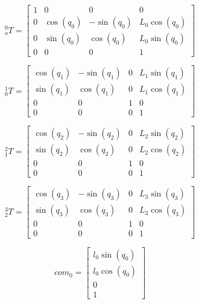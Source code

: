 \documentclass{article}
\begin{document}
\begin{equation}
	{}_o^0 T = \begin{bmatrix}
	1 & 0 & 0 & 0\\
	0 & \cos{(q_{0} )} & - \sin{(q_{0} )} & L_{0} \cos{(q_{0} )}\\
	0 & \sin{(q_{0} )} & \cos{(q_{0} )} & L_{0} \sin{(q_{0} )}\\
	0 & 0 & 0 & 1
\end{bmatrix}
\end{equation}

\begin{equation}
	{}_0^1 T = \begin{bmatrix}
	\cos{(q_{1} )} & - \sin{(q_{1} )} & 0 & L_{1} \sin{(q_{1} )}\\
	\sin{(q_{1} )} & \cos{(q_{1} )} & 0 & L_{1} \cos{(q_{1} )}\\
	0 & 0 & 1 & 0\\
	0 & 0 & 0 & 1
\end{bmatrix}
\end{equation}

\begin{equation}
	{}_1^2 T = \begin{bmatrix}
 	\cos{(q_{2} )} & - \sin{(q_{2} )} & 0 & L_{2} \sin{(q_{2} )}\\
 	\sin{(q_{2} )} & \cos{(q_{2} )} & 0 & L_{2} \cos{(q_{2} )}\\
 	0 & 0 & 1 & 0\\
 	0 & 0 & 0 & 1
\end{bmatrix}
\end{equation}

\begin{equation}
	{}_2^3 T = \begin{bmatrix}
 	\cos{(q_{3} )} & - \sin{(q_{3} )} & 0 & L_{3} \sin{(q_{3} )}\\
 	\sin{(q_{3} )} & \cos{(q_{3} )} & 0 & L_{3} \cos{(q_{3} )}\\
 	0 & 0 & 1 & 0\\
 	0 & 0 & 0 & 1
\end{bmatrix}
\end{equation}


\begin{equation}
	com_0 = \begin{bmatrix}
 	l_{0} \sin{(q_{0} )}\\
 	l_{0} \cos{(q_{0} )}\\
 	0\\
 	1
\end{bmatrix}
\end{equation}
\end{document}
